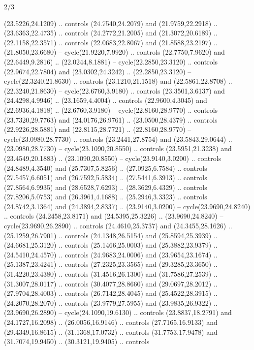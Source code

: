 \begin{flagdescription}{2/3}
\begin{scope}[yshift=\flagwidth,scale=\flagwidth/1241.93737]
\begin{scope}[y=-1mm, x=1mm,draw=gold,fill=blue,line join=miter,miter limit=4,line width=1.8\lw]
\begin{scope}[y=1mm, x=1mm, yscale=-1,shift={(573.68mm+\str,145.75)}]
\begin{scope}[scale=1.35,shift={(-9,-3)}]
\begin{scope}[scale=0.55]
\begin{scope}[scale=1.333]
    (23.5226,24.1209) .. controls (24.7540,24.2079) and (21.9759,22.2918) ..
    (23.6363,22.4735) .. controls (24.2772,21.2005) and (21.3072,20.6189) ..
    (22.1158,22.3571) .. controls (22.0683,22.8067) and (21.8588,23.2197) ..
    (21.8050,23.6680) -- cycle(21.9220,7.9920) .. controls (22.7750,7.9620) and
    (22.6449,9.2816) .. (22.0244,8.1881) -- cycle(22.2850,23.3120) .. controls
    (22.9674,22.7804) and (23.0302,24.3242) .. (22.2850,23.3120) --
    cycle(22.3240,21.8630) .. controls (23.1210,21.1518) and (22.5861,22.8708) ..
    (22.3240,21.8630) -- cycle(22.6760,3.9180) .. controls (23.3501,3.6137) and
    (24.4298,4.9946) .. (23.1659,4.4004) .. controls (22.9600,4.3045) and
    (22.6936,4.1818) .. (22.6760,3.9180) -- cycle(22.8160,28.9770) .. controls
    (23.7320,29.7763) and (24.0176,26.9761) .. (23.0500,28.4379) .. controls
    (22.9226,28.5881) and (22.8115,28.7721) .. (22.8160,28.9770) --
    cycle(23.0980,28.7730) .. controls (23.2441,27.8754) and (23.5843,29.0644) ..
    (23.0980,28.7730) -- cycle(23.1090,20.8550) .. controls (23.5951,21.3238) and
    (23.4549,20.1883) .. (23.1090,20.8550) -- cycle(23.9140,3.0200) .. controls
    (24.8489,4.3540) and (25.7307,5.8256) .. (27.0925,6.7584) .. controls
    (27.5457,6.6051) and (26.7592,5.5834) .. (27.5441,6.3913) .. controls
    (27.8564,6.9935) and (28.6528,7.6293) .. (28.3629,6.4329) .. controls
    (27.8206,5.0753) and (26.3961,4.1688) .. (25.2946,3.3323) .. controls
    (24.8742,3.1364) and (24.3894,2.8337) .. (23.9140,3.0200) --
    cycle(23.9690,24.8240) .. controls (24.2458,23.8171) and (24.5395,25.3226) ..
    (23.9690,24.8240) -- cycle(23.9690,26.2890) .. controls (24.4610,25.3737) and
    (24.3455,28.1626) .. (25.1259,26.7901) .. controls (24.1348,26.5154) and
    (25.8594,25.3939) .. (24.6681,25.3120) .. controls (25.1466,25.0003) and
    (25.3882,23.9379) .. (24.5410,24.4570) .. controls (24.9683,24.0006) and
    (23.9654,23.1674) .. (25.1387,23.4241) .. controls (27.2325,23.3565) and
    (29.3285,23.3650) .. (31.4220,23.4380) .. controls (31.4516,26.1300) and
    (31.7586,27.2539) .. (31.3007,28.0117) .. controls (30.4077,28.8660) and
    (29.0697,28.2012) .. (27.9704,28.4003) .. controls (26.7142,28.4045) and
    (25.4522,28.3915) .. (24.2070,28.2070) .. controls (23.9779,27.5955) and
    (23.9835,26.9322) .. (23.9690,26.2890) -- cycle(24.1090,19.6130) .. controls
    (23.8837,18.2791) and (24.1727,16.2098) .. (26.0056,16.9146) .. controls
    (27.7165,16.9133) and (29.4349,16.8615) .. (31.1368,17.0732) .. controls
    (31.7753,17.9478) and (31.7074,19.9450) .. (30.3121,19.9405) .. controls

\end{scope}
\end{scope}
\end{scope}
\end{scope}
\end{scope}
\end{scope}
\end{flagdescription}
